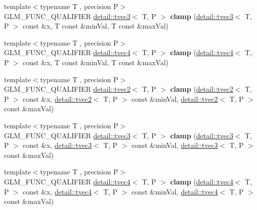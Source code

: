 \begin{DoxyCompactItemize}
\item 
{\footnotesize template$<$typename T , precision P$>$ }\\G\+L\+M\+\_\+\+F\+U\+N\+C\+\_\+\+Q\+U\+A\+L\+I\+F\+I\+ER \hyperlink{structglm_1_1detail_1_1tvec3}{detail\+::tvec3}$<$ T, P $>$ {\bfseries clamp} (\hyperlink{structglm_1_1detail_1_1tvec3}{detail\+::tvec3}$<$ T, P $>$ const \&x, T const \&min\+Val, T const \&max\+Val)\hypertarget{namespaceglm_a5480cd78f9efc725f850ea4f239bfd2d}{}\label{namespaceglm_a5480cd78f9efc725f850ea4f239bfd2d}

\item 
{\footnotesize template$<$typename T , precision P$>$ }\\G\+L\+M\+\_\+\+F\+U\+N\+C\+\_\+\+Q\+U\+A\+L\+I\+F\+I\+ER \hyperlink{structglm_1_1detail_1_1tvec4}{detail\+::tvec4}$<$ T, P $>$ {\bfseries clamp} (\hyperlink{structglm_1_1detail_1_1tvec4}{detail\+::tvec4}$<$ T, P $>$ const \&x, T const \&min\+Val, T const \&max\+Val)\hypertarget{namespaceglm_ada0741f13869762e0238572ba8c79d4a}{}\label{namespaceglm_ada0741f13869762e0238572ba8c79d4a}

\item 
{\footnotesize template$<$typename T , precision P$>$ }\\G\+L\+M\+\_\+\+F\+U\+N\+C\+\_\+\+Q\+U\+A\+L\+I\+F\+I\+ER \hyperlink{structglm_1_1detail_1_1tvec2}{detail\+::tvec2}$<$ T, P $>$ {\bfseries clamp} (\hyperlink{structglm_1_1detail_1_1tvec2}{detail\+::tvec2}$<$ T, P $>$ const \&x, \hyperlink{structglm_1_1detail_1_1tvec2}{detail\+::tvec2}$<$ T, P $>$ const \&min\+Val, \hyperlink{structglm_1_1detail_1_1tvec2}{detail\+::tvec2}$<$ T, P $>$ const \&max\+Val)\hypertarget{namespaceglm_a3619aef4490284ac6ca86a552652c143}{}\label{namespaceglm_a3619aef4490284ac6ca86a552652c143}

\item 
{\footnotesize template$<$typename T , precision P$>$ }\\G\+L\+M\+\_\+\+F\+U\+N\+C\+\_\+\+Q\+U\+A\+L\+I\+F\+I\+ER \hyperlink{structglm_1_1detail_1_1tvec3}{detail\+::tvec3}$<$ T, P $>$ {\bfseries clamp} (\hyperlink{structglm_1_1detail_1_1tvec3}{detail\+::tvec3}$<$ T, P $>$ const \&x, \hyperlink{structglm_1_1detail_1_1tvec3}{detail\+::tvec3}$<$ T, P $>$ const \&min\+Val, \hyperlink{structglm_1_1detail_1_1tvec3}{detail\+::tvec3}$<$ T, P $>$ const \&max\+Val)\hypertarget{namespaceglm_af80d006213e383bf05fd767386b14067}{}\label{namespaceglm_af80d006213e383bf05fd767386b14067}

\item 
{\footnotesize template$<$typename T , precision P$>$ }\\G\+L\+M\+\_\+\+F\+U\+N\+C\+\_\+\+Q\+U\+A\+L\+I\+F\+I\+ER \hyperlink{structglm_1_1detail_1_1tvec4}{detail\+::tvec4}$<$ T, P $>$ {\bfseries clamp} (\hyperlink{structglm_1_1detail_1_1tvec4}{detail\+::tvec4}$<$ T, P $>$ const \&x, \hyperlink{structglm_1_1detail_1_1tvec4}{detail\+::tvec4}$<$ T, P $>$ const \&min\+Val, \hyperlink{structglm_1_1detail_1_1tvec4}{detail\+::tvec4}$<$ T, P $>$ const \&max\+Val)\hypertarget{namespaceglm_a0da32315c939ba1df21b2509df74e037}{}\label{namespaceglm_a0da32315c939ba1df21b2509df74e037}


\end{DoxyCompactItemize}

